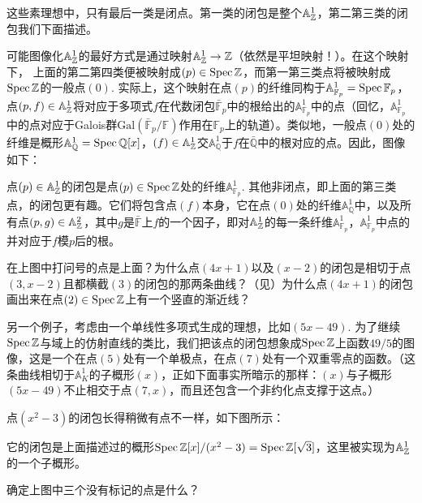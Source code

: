 这些素理想中，只有最后一类是闭点。第一类的闭包是整个$\mathbb{A}_{\mathbb{Z}}^1$，第二第三类的闭包我们下面描述。

可能图像化$\mathbb{A}_{\mathbb{Z}}^1$的最好方式是通过映射$\mathbb{A}_{\mathbb{Z}}^1\to\mathbb{Z}$（依然是平坦映射！）。在这个映射下， 上面的第二第四类便被映射成$(p)\in\operatorname{Spec} \mathbb{Z}$，而第一第三类点将被映射成$\operatorname{Spec} \mathbb{Z}$的一般点$(0)$. 实际上，这个映射在点$(p)$的纤维同构于$\mathbb{A}_{\mathbb{F}_p}^1=\operatorname{Spec} \mathbb{F}_p$，点$(p,f)\in\mathbb{A}_{\mathbb{Z}}^1$将对应于多项式$f$在代数闭包$\bar{\mathbb{F}}_p$中的根给出的$\mathbb{A}_{\mathbb{F}_p}^1$中的点（回忆，$\mathbb{A}_{\mathbb{F}_p}^1$中的点对应于Galois群$\mathrm{Gal}\left(\bar{\mathbb{F}}_p/\mathbb{F}\right)$作用在$\mathbb{F}_p$上的轨道）。类似地，一般点$(0)$处的纤维是概形$\mathbb{A}_\mathbb{Q}^1=\operatorname{Spec} \mathbb{Q}[x]$，$(f)\in\mathbb{A}_{\mathbb{Z}}^1$交$\mathbb{A}_\mathbb{Q}^1$于$f$在$\bar{\mathbb{Q}}$中的根对应的点。因此，图像如下：

\label{p.2.18}

点$(p)\in\mathbb{A}_{\mathbb{Z}}^1$的闭包是点$(p)\in \operatorname{Spec} \mathbb{Z}$处的纤维$\mathbb{A}_{\mathbb{F}_p}^1$. 其他非闭点，即上面的第三类点，的闭包更有趣。它们将包含点$(f)$本身，它在点$(0)$处的纤维$\mathbb{A}_\mathbb{Q}^1$中，以及所有点$(p,g)\in\mathbb{A}_{\mathbb{Z}}^2$，其中$g$是$\bar{\mathbb{F}}$上$f$的一个因子，即对$\mathbb{A}_{\mathbb{Z}}^1$的每一条纤维$\mathbb{A}_{\mathbb{F}_p}^1$，$\mathbb{A}_{\mathbb{F}_p}^1$中点的并对应于$f$模$p$后的根。

\begin{exe}
	在上图中打问号的点是上面？为什么点$(4x+1)$以及$(x-2)$的闭包是相切于点$(3,x-2)$且都横截$(3)$的闭包的那两条曲线？（见\nottran）为什么点$(4x+1)$的闭包画出来在点$(2)\in\operatorname{Spec} \mathbb{Z}$上有一个竖直的渐近线？
\end{exe}

另一个例子，考虑由一个单线性多项式生成的理想，比如$(5x-49)$. 为了继续$\operatorname{Spec} \mathbb{Z}$与域上的仿射直线的类比，我们把该点的闭包想象成$\operatorname{Spec}\mathbb{Z}$上函数$49/5$的图像，这是一个在点$(5)$处有一个单极点，在点$(7)$处有一个双重零点的函数。（这条曲线相切于$\mathbb{A}_K^1$的子概形$(x)$，正如下面事实所暗示的那样：$(x)$与子概形$(5x-49)$不止相交于点$(7,x)$，而且还包含一个非约化点支撑于这点。）

点$(x^2-3)$的闭包长得稍微有点不一样，如下图所示：


\noindent 它的闭包是上面描述过的概形$\operatorname{Spec} \mathbb{Z}[x]/(x^2-3)=\operatorname{Spec} \mathbb{Z}[\sqrt 3]$，这里被实现为$\mathbb{A}_{\mathbb{Z}}^1$的一个子概形。

\begin{exe}
	确定上图中三个没有标记的点是什么？
\end{exe}

